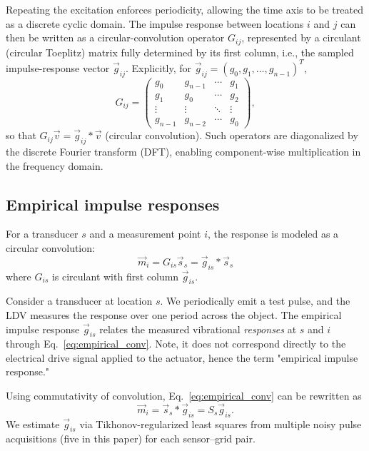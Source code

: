 \documentclass[a4paper,fleqn]{cas-sc}
\begin{document}
Repeating the excitation enforces periodicity, allowing the time axis to be treated as a discrete cyclic domain. The impulse response between locations $i$ and $j$ can then be written as a circular-convolution operator $G_{ij}$, represented by a circulant (circular Toeplitz) matrix fully determined by its first column, i.e., the sampled impulse-response vector $\vec g_{ij}$. Explicitly, for $\vec g_{ij} = (g_0, g_1, \ldots, g_{n-1})^T$,
\begin{equation}
G_{ij} = \begin{pmatrix}
g_0 & g_{n-1} & \cdots & g_1 \\
g_1 & g_0 & \cdots & g_2 \\
\vdots & \vdots & \ddots & \vdots \\
g_{n-1} & g_{n-2} & \cdots & g_0
\end{pmatrix},
\end{equation}
so that $G_{ij}\vec v = \vec g_{ij} * \vec v$ (circular convolution). Such operators are diagonalized by the discrete Fourier transform (DFT), enabling component-wise multiplication in the frequency domain.



\subsection{Empirical impulse responses}\label{Empirical impulse responses}
For a transducer $s$ and a measurement point $i$, the response is modeled as a circular convolution:
\begin{equation}\label{eq:empirical_conv}
\vec m_{i} = G_{is} \vec s_s = \vec g_{is}\ast\vec s_s
\end{equation}
where $G_{is}$ is circulant with first column $\vec g_{is}$.

Consider a transducer at location $s$. We periodically emit a test pulse, and the LDV measures the response over one period across the object. The empirical impulse response $\vec{g}_{is}$ relates the measured vibrational \textit{responses} at $s$ and $i$ through Eq.~\ref{eq:empirical_conv}. Note, it does not correspond directly to the electrical drive signal applied to the actuator, hence the term "empirical impulse response."

Using commutativity of convolution, Eq.~\ref{eq:empirical_conv} can be rewritten as
\begin{equation}
    \vec{m}_i = \vec s_s\ast\vec g_{is} = S_s\vec{g}_{is}.
\end{equation}
We estimate $\vec{g}_{is}$ via Tikhonov-regularized least squares \cite{tikhonovintro,Tikhonov} from multiple noisy pulse acquisitions (five in this paper) for each sensor--grid pair.
\end{document}
